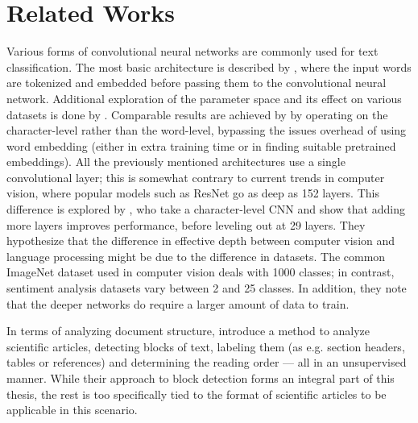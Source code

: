 \section{Related Works}

Various forms of convolutional neural networks are commonly used for text
classification. The most basic architecture is described by
\textcite{kim2014conv}, where the input words are tokenized and embedded before
passing them to the convolutional neural network. Additional exploration of the
parameter space and its effect on various datasets is done by
\textcite{zhang2015conv}. Comparable results are achieved by
\textcite{zhang2015character} by operating on the character-level rather than
the word-level, bypassing the issues overhead of using word embedding (either in
extra training time or in finding suitable pretrained embeddings). All the
previously mentioned architectures use a single convolutional layer; this is
somewhat contrary to current trends in computer vision, where popular models
such as ResNet\citep{resnet2015} go as deep as 152 layers. This difference is
explored by \textcite{Conneau2016ldeep}, who take a character-level CNN and show
that adding more layers improves performance, before leveling out at 29 layers.
They hypothesize that the difference in effective depth between computer vision
and language processing might be due to the difference in datasets. The common
ImageNet dataset used in computer vision deals with 1000 classes; in contrast,
sentiment analysis datasets vary between 2 and 25 classes. In addition, they
note that the deeper networks do require a larger amount of data to train.

In terms of analyzing document structure, \textcite{klampfl2014unsupervised}
introduce a method to analyze scientific articles, detecting blocks of text,
labeling them (as e.g. section headers, tables or references) and determining
the reading order --- all in an unsupervised manner. While their approach to
block detection forms an integral part of this thesis, the rest is too
specifically tied to the format of scientific articles to be applicable in this
scenario.

